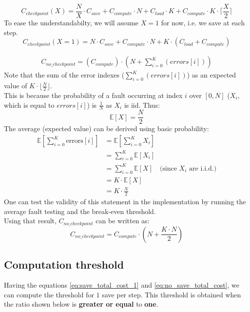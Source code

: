 \documentclass[11pt,a4paper]{report}
\begin{document}
\begin{equation}
C_{checkpoint}(X) = \frac{N}{X} \cdot C_{save} + C_{compute} \cdot N + C_{load} \cdot K + C_{compute} \cdot K \cdot \lceil \frac{X}{2} \rceil
\label{eq:save_total_cost_x}
\end{equation}
To ease the understandabilty, we will assume $X=1$ for now, i.e. we save at each step.
\begin{equation}
C_{checkpoint}(X{=}1) = N \cdot C_{save} + C_{compute} \cdot N + K \cdot (C_{load} + C_{compute})
\label{eq:save_total_cost_1}
\end{equation}

\begin{align*}
C_{no\_checkpoint} = (C_{compute}) \cdot (N + \sum_{i=0}^{K}(errors[i]))
\end{align*}
Note that the sum of the error indexes ($\sum_{i=0}^{K}(errors[i])$) as an expected value of $K \cdot \lfloor \frac{N}{2} \rfloor$.\\
This is because the probability of a fault occurring at index $i$ over $[0, N]$ ($X_i$, which is equal to $errors[i]$) is $\frac{1}{N}$ as $X_i$ is iid. Thus:
\begin{equation}
\mathbb{E}[X] = \frac{N}{2} 
\label{eq:expected_error}
\end{equation}
The average (expected value) can be derived using basic probability:
\begin{align*}
\mathbb{E}\left[\sum_{i=0}^{K} \text{errors}[i]\right]
&= \mathbb{E}\left[\sum_{i=0}^{K} X_i\right] \\
&= \sum_{i=0}^{K} \mathbb{E}[X_i] \\
&= \sum_{i=0}^{K} \mathbb{E}[X] \quad \text{(since } X_i \text{ are i.i.d.)} \\
&= K \cdot \mathbb{E}[X] \\
&= K \cdot \frac{N}{2}
\end{align*}
One can test the validity of this statement in the implementation by running the average fault testing and the break-even threshold. \\
Using that result, $C_{no\_checkpoint}$ can be written as:
\begin{equation}
C_{no\_checkpoint} = C_{compute} \cdot \left(N + \frac{K \cdot N}{2}\right)
\label{eq:no_save_total_cost}
\end{equation}

\subsection{Computation threshold}
Having the equations \ref{eq:save_total_cost_1} and \ref{eq:no_save_total_cost}, we can compute the threshold for $1$ save per step.
This threshold is obtained when the ratio shown below is \textbf{greater or equal} to \textbf{one}.
\\
\end{document}
